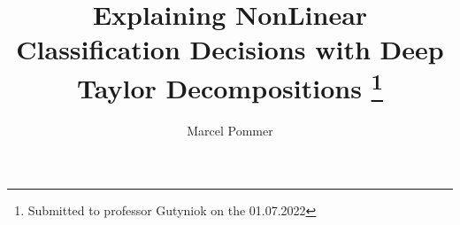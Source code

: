 


\usepackage{amsfonts}
\usepackage{graphicx}
\usepackage{epstopdf}
\usepackage{multirow}
\usepackage{hyperref}
\usepackage{algorithmic}
\ifpdf
\else
\fi

\newcommand{\creflastconjunction}{, and~}



\title{Explaining NonLinear Classification Decisions with Deep Taylor Decompositions
\thanks{Submitted to professor Gutyniok on the 01.07.2022}}

\author{Marcel Pommer}

\usepackage{amsopn}
\DeclareMathOperator{\diag}{diag}


